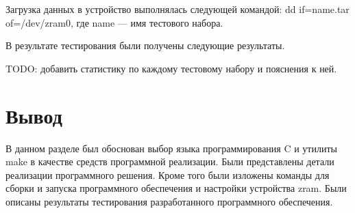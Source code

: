 Загрузка данных в устройство выполнялась следующей командой: dd if=name.tar of=/dev/zram0, где name --- имя тестового набора.

В результате тестирования были получены следующие результаты.

TODO: добавить статистику по каждому тестовому набору и пояснения к ней.

\section*{Вывод}

В данном разделе был обоснован выбор языка программирования C и утилиты make в качестве средств программной реализации. Были представлены детали реализации программного решения. Кроме того были изложены команды для сборки и запуска программного обеспечения и настройки устройства zram. Были описаны результаты тестирования разработанного программного обеспечения.
